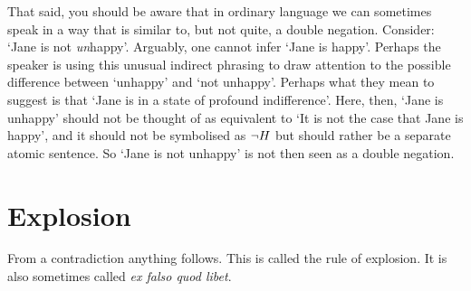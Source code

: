 %

That said, you should be aware that
in ordinary language we can sometimes speak in a way that is similar to, but not quite, a double negation.
Consider: `Jane is not \emph{un}happy'. Arguably, one cannot infer `Jane is happy'.
Perhaps the speaker is using this unusual indirect phrasing to draw attention to the possible difference between `unhappy' and `not unhappy'.
Perhaps what they mean to suggest is that
`Jane is in a state of profound indifference'.
Here, then, `Jane is unhappy' should not be thought of as equivalent to `It is not the case that Jane is happy', and it should not be symbolised as $\neg H$ but should rather be a separate atomic sentence. So `Jane is not unhappy' is not then seen as a double negation.
%


\section{Explosion}
From a contradiction anything follows. This is called the rule of explosion. It is also sometimes called \emph{ex falso quod libet}. 

